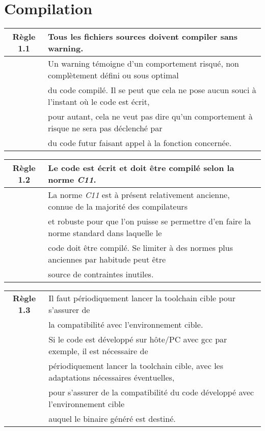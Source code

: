 \section{Compilation}

\begin{center}
\begin{tabular}{|c l|}
\hline
\rowcolor{red!10}\textbf{Règle 1.1} & Tous les fichiers sources doivent compiler sans warning. \\ \hline
 & 	Un warning témoigne d’un comportement risqué, non complètement défini ou sous optimal \\
 & du code compilé. Il se peut que cela ne pose aucun souci à l’instant où le code est écrit, \\
 & pour autant, cela ne veut pas dire qu’un comportement à risque ne sera pas déclenché par \\
 & du code futur faisant appel à la fonction concernée.\\ \hline
\hline
\end{tabular}
\end{center}

\medskip

\begin{center}
\begin{tabular}{|c l|}
\hline
\rowcolor{red!10}\textbf{Règle 1.2} & Le code est écrit et doit être compilé selon la norme \textit{C11}. \\ \hline
 & La norme \textit{C11} est à présent relativement ancienne, connue de la majorité des compilateurs \\
 & et robuste pour que l’on puisse se permettre d’en faire la norme standard dans laquelle le \\
 & code doit être compilé. Se limiter à des normes plus anciennes par habitude peut être \\
 & source de contraintes inutiles.\\ \hline
\hline
\end{tabular}
\end{center}

\medskip

\begin{center}
\begin{tabular}{|c l|}
\hline
\rowcolor{red!10}\textbf{Règle 1.3} & Il faut périodiquement lancer la toolchain cible pour s’assurer de \\
\rowcolor{red!10} & la compatibilité avec l’environnement cible. \\ \hline
 &  Si le code est développé sur hôte/PC avec gcc par exemple, il est nécessaire de \\
 & périodiquement lancer la toolchain cible, avec les adaptations nécessaires éventuelles, \\
 & pour s’assurer de la compatibilité du code développé avec l’environnement cible \\
 & auquel le binaire généré est destiné. \\ \hline
\hline
\end{tabular}
\end{center}

